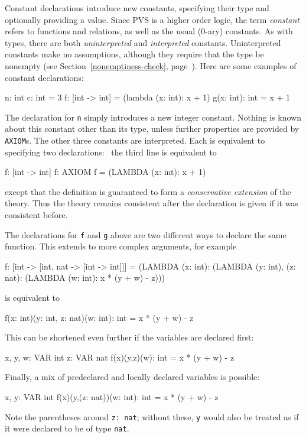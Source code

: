 Constant declarations introduce new constants, specifying their type and
optionally providing a value.  Since PVS is a higher order logic, the term
\emph{constant} refers to functions and relations, as well as the usual
(0-ary) constants.  As with types, there are both \emph{uninterpreted} and
\emph{interpreted} %
 constants.  Uninterpreted constants make
no assumptions, although they require that the type be nonempty (see
Section~\ref{nonemptiness-check}, page~\pageref{nonemptiness-check}).
Here are some examples of constant declarations:
\begin{pvsex}
  n: int
  c: int = 3
  f: [int -> int] = (lambda (x: int): x + 1)
  g(x: int): int = x + 1
\end{pvsex}
%
The declaration for \texttt{n} simply introduces a new integer constant.
Nothing is known about this constant other than its type, unless further
properties are provided by \texttt{AXIOM}s.  The other three constants are
interpreted.  Each is equivalent to specifying two declarations: \eg\
the third line is equivalent to
\begin{pvsex}
  f: [int -> int]
  f: AXIOM  f = (LAMBDA (x: int): x + 1)
\end{pvsex}
%
except that the definition is guaranteed to form a \emph{conservative
extension}\index{conservative extension} of the theory.  Thus the
theory remains consistent after the declaration is given if it was
consistent before.

The declarations for \texttt{f} and \texttt{g} above are two different ways to
declare the same function.  This extends to more complex arguments, for
example
\begin{pvsex}
  f: [int -> [int, nat -> [int -> int]]] =
     (LAMBDA (x: int): (LAMBDA (y: int), (z: nat): (LAMBDA (w: int):
       x * (y + w) - z)))
\end{pvsex}
%
is equivalent to
\begin{pvsex}
  f(x: int)(y: int, z: nat)(w: int): int = x * (y + w) - z
\end{pvsex}
%
This can be shortened even further if the variables are declared first:
\begin{pvsex}
  x, y, w: VAR int
  z: VAR nat
  f(x)(y,z)(w): int = x * (y + w) - z
\end{pvsex}
%
Finally, a mix of predeclared and locally declared variables is possible:
\begin{pvsex}
  x, y: VAR int
  f(x)(y,(z: nat))(w: int): int = x * (y + w) - z
\end{pvsex}
%
Note the parentheses around \texttt{z:\ nat}; without these, \texttt{y} would
also be treated as if it were declared to be of type \texttt{nat}.

